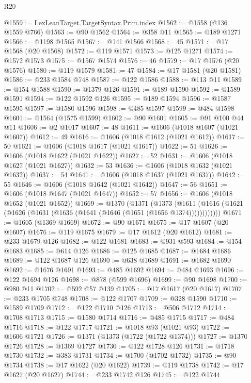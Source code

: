 \begin{lexlean}{R20}
\begin{coremodule}
@1559 := LexLeanTarget.TargetSyntax.Prim.index
@1562 := @1558 (@136 @1559 @766)
@1563 := @90 @1562
@1564 := @358 @11
@1565 := @189 @1271
@1566 := @1198 @1565
@1567 := @141 @1566
@1568 := 45
@1571 := @17 @1568 (@20 @1568)
@1572 := @119 @1571
@1573 := @125 @1271
@1574 := @1572 @1573
@1575 := @1567 @1574
@1576 := 46
@1579 := @17 @1576 (@20 @1576)
@1580 := @119 @1579
@1581 := 47
@1584 := @17 @1581 (@20 @1581)
@1586 := @233 @1584 @748
@1587 := @122 @1586
@1588 := @113 @11
@1589 := @154 @1588
@1590 := @1379 @126
@1591 := @189 @1590
@1592 := @1589 @1591
@1594 := @122 @1592 @126
@1595 := @189 @1594
@1596 := @1587 @1595
@1597 := @1580 @1596
@1598 := @485 @1597
@1599 := @484 @1598
@1601 := @1564 (@1575 @1599)
@1602 := @90 @1601
@1605 := @91 @100 @44 @11
@1606 := @2 @1017
@1607 := 48
@1611 := @1606 (@1018 @1607 (@1021 @1607))
@1612 := 49
@1616 := @1606 (@1018 @1612 (@1021 @1612))
@1617 := 50
@1621 := @1606 (@1018 @1617 (@1021 @1617))
@1622 := 51
@1626 := @1606 (@1018 @1622 (@1021 @1622))
@1627 := 52
@1631 := @1606 (@1018 @1627 (@1021 @1627))
@1632 := 53
@1636 := @1606 (@1018 @1632 (@1021 @1632))
@1637 := 54
@1641 := @1606 (@1018 @1637 (@1021 @1637))
@1642 := 55
@1646 := @1606 (@1018 @1642 (@1021 @1642))
@1647 := 56
@1651 := @1606 (@1018 @1647 (@1021 @1647))
@1652 := 57
@1656 := @1606 (@1018 @1652 (@1021 @1652))
@1669 := @1370
    (@1371
      (@1373 (@1611 (@1616 (@1621 (@1626 (@1631 (@1636 (@1641 (@1646 (@1651 (@1656 @1374))))))))))))
@1671 := @1605 (@1369 @1669)
@1672 := @90 @1671
@1675 := @17 @1607 (@20 @1607)
@1676 := @119 @1675
@1679 := @17 @1612 (@20 @1612)
@1681 := @233 @1679 @126
@1682 := @122 @1681
@1683 := @931 @593
@1684 := @154 @1683
@1685 := @614 @126
@1686 := @125 @1685
@1687 := @1684 @1686
@1689 := @122 @1687 @126
@1690 := @638 @1689
@1691 := @1682 @1690
@1692 := @1676 @1691
@1693 := @485 @1692
@1694 := @484 @1693
@1696 := @122 @1694 @126
@1698 := @878 (@599 @1696)
@1699 := @90 @1698
@1700 := @980 @11
@1702 := @592 @57 @139
@1705 := @17 @1617 (@20 @1617)
@1707 := @233 @1705 @748
@1708 := @122 @1707
@1709 := @328 @1590
@1710 := @1589 @1709
@1712 := @122 @1710 @126
@1713 := @506 @1712
@1714 := @1708 @1713
@1715 := @1580 @1714
@1716 := @485 @1715
@1717 := @484 @1716
@1718 := @122 @1717
@1721 := @1018 @93 (@1021 @93)
@1722 := @1606 @1721
@1726 := @1371 (@1373 (@1722 (@1722 @1374)))
@1727 := @1370 @1726
@1728 := @1369 @1727
@1730 := @122 @1728 @126
@1731 := @1718 @1730
@1732 := @383 @1731
@1734 := @1700 (@1702 @1732)
@1735 := @90 @1734
@1738 := @17 @1622 (@20 @1622)
@1739 := @119 @1738
@1742 := @17 @1627 (@20 @1627)
@1744 := @233 @1742 @126
@1745 := @122 @1744

\end{coremodule}
\end{lexlean}

